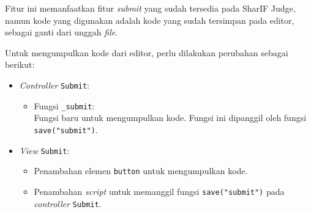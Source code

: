 Fitur ini memanfaatkan fitur \textit{submit} yang sudah tersedia pada SharIF Judge, namun kode yang digunakan adalah kode yang sudah tersimpan pada editor, sebagai ganti dari unggah \textit{file}. 

Untuk mengumpulkan kode dari editor, perlu dilakukan perubahan sebagai berikut:
\begin{itemize}
	\item \textit{Controller} \verb|Submit|:
    \begin{itemize}
		\item Fungsi \verb|_submit|: \\ Fungsi baru untuk mengumpulkan kode. Fungsi ini dipanggil oleh fungsi \verb|save("submit")|.
    \end{itemize}
    \item \textit{View} \verb|Submit|:
    \begin{itemize}
        \item Penambahan elemen \verb|button| untuk mengumpulkan kode.
        \item Penambahan \textit{script} untuk memanggil fungsi \verb|save("submit")| pada \textit{controller} \verb|Submit|. 
    \end{itemize}
\end{itemize}
